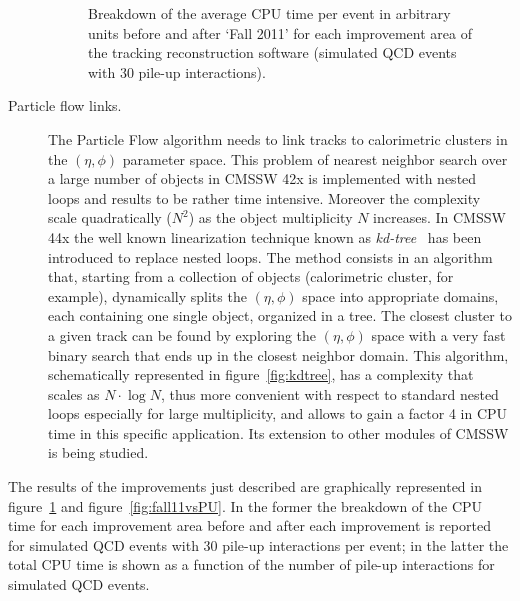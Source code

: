 \begin{description}
\begin{figure}[b]
\begin{minipage}[b]{0.38\textwidth}\caption{\label{fig:fall11}Breakdown
    of the average CPU time per event in arbitrary units before and after 
  `Fall 2011' for each improvement area of the tracking reconstruction
  software (simulated QCD events with 30 pile-up interactions).}
\end{minipage}
\end{figure}
\item[Particle flow links.] The Particle Flow algorithm needs to link
  tracks to calorimetric clusters in the $(\eta, \phi)$ parameter space. This
  problem of nearest neighbor search 
  over a large number of objects in CMSSW 42x is implemented with
  nested loops and results to be rather time intensive. Moreover the
  complexity scale quadratically ($N^2$) as the object multiplicity
  $N$ increases. In CMSSW 44x the well known linearization technique
  known as {\em kd-tree}~\cite{kdtree} has been introduced to replace nested
  loops. The method consists in an algorithm that, starting from a
  collection of objects (calorimetric cluster, for example),
  dynamically splits the $(\eta, \phi)$ space into appropriate domains,
  each containing one single object, organized in a tree. The closest
  cluster to a given track can be found by 
  exploring the $(\eta, \phi)$ space with a very fast binary search
  that ends up in the closest neighbor domain. This algorithm,
  schematically represented in figure~\ref{fig:kdtree}, has a complexity
  that scales as $N\cdot\log N$, thus more convenient with respect to
  standard nested loops especially for large multiplicity, and allows to
  gain a factor 4 in CPU time in this specific application. Its
  extension to other modules of CMSSW is being studied.
\end{description}
 The results of the improvements just described are graphically
represented in figure~\ref{fig:fall11} and figure~\ref{fig:fall11vsPU}. In the
former the breakdown of the CPU time for each improvement area before
and after each improvement is reported for simulated QCD events with
30 pile-up interactions per event; in the latter the total CPU time is
shown as a function of the number of pile-up interactions for simulated QCD events.
